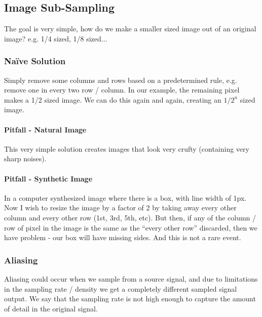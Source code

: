 \documentclass[11pt]{article}
\begin{document}
\subsection{Image Sub-Sampling}
The goal is very simple, how do we make a smaller sized image out of an original image? e.g. 1/4 sized, 1/8 sized...
\subsubsection{Na\"ive Solution} Simply remove some columns and rows based on a predetermined rule, e.g. remove one in every two row / column. In our example, the remaining pixel makes a 1/2 sized image. We can do this again and again, creating an $1 / 2^n$ sized image. 
\paragraph{Pitfall - Natural Image} This very simple solution creates images that look very crufty (containing very sharp noises). 
\paragraph{Pitfall - Synthetic Image} In a computer synthesized image where there is a box, with line width of 1px. Now I wish to resize the image by a factor of 2 by taking away every other column and every other row (1st, 3rd, 5th, etc). But then, if any of the column / row of pixel in the image is the same as the ``every other row'' discarded, then we have problem - our box will have missing sides. And this is not a rare event. 

\subsubsection{Aliasing}
Aliasing could occur when we sample from a source signal, and due to limitations in the sampling rate / density we get a completely different sampled signal output. We say that the sampling rate is not high enough to capture the amount of detail in the original signal.  
\end{document}
